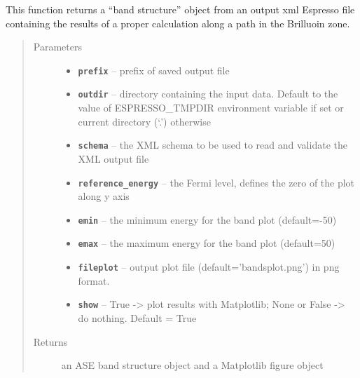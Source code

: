 \documentclass[letterpaper,10pt,english]{sphinxmanual}
\begin{document}
\begin{fulllineitems}
\label{postqe:postqe.api.compute_band_structure}
This function returns a ``band structure'' object from an output xml Espresso file
containing the results of a proper calculation along a path in the Brilluoin zone.
\begin{quote}\begin{description}
\item[{Parameters}] \leavevmode\begin{itemize}
\item {} 
\textbf{\texttt{prefix}} -- prefix of saved output file

\item {} 
\textbf{\texttt{outdir}} -- directory containing the input data. Default to the value of
ESPRESSO\_TMPDIR environment variable if set or current directory (`.') otherwise

\item {} 
\textbf{\texttt{schema}} -- the XML schema to be used to read and validate the XML output file

\item {} 
\textbf{\texttt{reference\_energy}} -- the Fermi level, defines the zero of the plot along y axis

\item {} 
\textbf{\texttt{emin}} -- the minimum energy for the band plot (default=-50)

\item {} 
\textbf{\texttt{emax}} -- the maximum energy for the band plot (default=50)

\item {} 
\textbf{\texttt{fileplot}} -- output plot file (default='bandsplot.png') in png format.

\item {} 
\textbf{\texttt{show}} -- True -\textgreater{} plot results with Matplotlib; None or False -\textgreater{} do nothing. Default = True

\end{itemize}

\item[{Returns}] \leavevmode
an ASE band structure object and a Matplotlib figure object

\end{description}\end{quote}

\end{fulllineitems}
\end{document}
